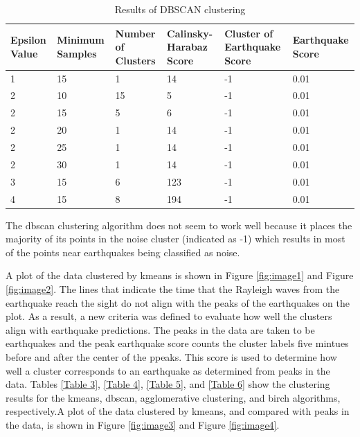\documentclass[colorlinks=true,pdfstartview=FitV,linkcolor=blue,
            citecolor=red,urlcolor=magenta]{ligodoc}
\begin{document}
\begin{table}[h!]
\centering
 \begin{tabular}{|m{2cm} m{2.25cm} m{2.25cm} m{2.25cm} m{2.25cm} m{2.25cm}|} 
 \hline
 Epsilon Value & Minimum Samples & Number of Clusters & Calinsky-Harabaz Score & Cluster of Earthquake Score & Earthquake Score\\ [0.5ex] 
 \hline\hline
 1 & 15 & 1 & 14 & -1 & 0.01\\ 
 \hline
 2 & 10 & 15  & 5 & -1 & 0.01\\
 \hline
 2 & 15 & 5 & 6 & -1 & 0.01\\ 
 \hline
 2 & 20 & 1 & 14 & -1 & 0.01\\
 \hline
 2 & 25 & 1 & 14 & -1 & 0.01\\
 \hline
 2 & 30 & 1 & 14 & -1 & 0.01\\
 \hline
 3 & 15 & 6 & 123 & -1 & 0.01\\
 \hline
 4 & 15 & 8 & 194 & -1 & 0.01\\
 \hline
 \end{tabular}
 \caption{Results of DBSCAN clustering}
 \label{Table 2}
\end{table}

\par The dbscan clustering algorithm does not seem to work well because it places the majority of its points in the noise cluster (indicated as -1)  which results in most of the points near earthquakes being classified as noise.

\par A plot of the data clustered by kmeans is shown in Figure \ref{fig:image1} and Figure \ref{fig:image2}. The lines that indicate the time that the Rayleigh waves from the earthquake reach the sight do not align with the peaks of the earthquakes on the plot. As a result, a new criteria was defined to evaluate how well the clusters align with earthquake predictions. The peaks in the data are taken to be earthquakes and the peak earthquake score  counts the cluster labels five mintues before and after the center of the ppeaks. This score is used to determine how well a cluster corresponds to an earthquake as determined from peaks in the data. Tables \ref{Table 3}, \ref{Table 4}, \ref{Table 5}, and \ref{Table 6} show the clustering results for the kmeans, dbscan, agglomerative clustering, and birch algorithms, respectively.A plot of the data clustered by kmeans, and compared with peaks in the data, is shown in Figure \ref{fig:image3} and Figure \ref{fig:image4}.
\end{document}
